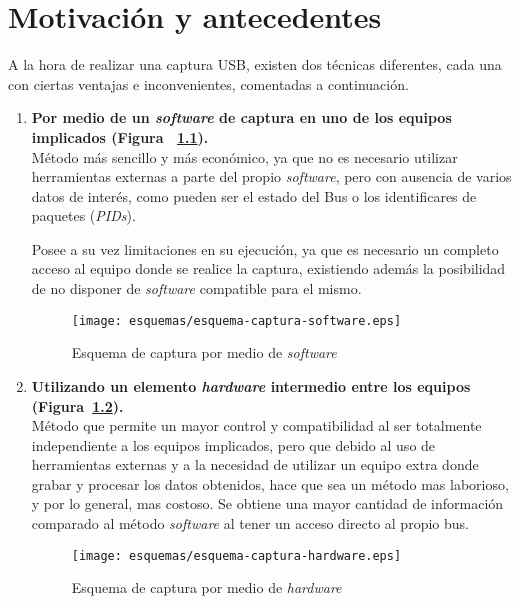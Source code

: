 \chapter{Motivación y antecedentes}
\label{ch:antecedentes}

A la hora de realizar una captura USB, existen dos técnicas diferentes, cada una con ciertas ventajas e inconvenientes, comentadas a continuación.
\begin{enumerate}
    \item \textbf{Por medio de un \textit{software} de captura en uno de los equipos implicados (Figura ~\ref{fig:captura-SW}).} \\
    Método más sencillo y más económico, ya que no es necesario utilizar herramientas externas a parte del propio \textit{software}, pero con ausencia de varios datos de interés, como pueden ser el estado del Bus o los identificares de paquetes (\emph{PIDs}).
    
    Posee a su vez limitaciones en su ejecución, ya que es necesario un completo acceso al equipo donde se realice la captura, existiendo además la posibilidad de no disponer de \textit{software} compatible para el mismo. 
    \begin{figure}[hbt]
        \centering
        \texttt{[image: esquemas/esquema-captura-software.eps]}
        \caption{Esquema de captura por medio de \textit{software}}
        \label{fig:captura-SW}
    \end{figure}
    
    \item \textbf{Utilizando un elemento \textit{hardware} intermedio entre los equipos (Figura~\ref{fig:captura-HW}).} \\
    Método que permite un mayor control y compatibilidad al ser totalmente independiente a los equipos implicados, pero que debido al uso de herramientas externas y a la necesidad de utilizar un equipo extra donde grabar y procesar los datos obtenidos, hace que sea un método mas laborioso, y por lo general, mas costoso.
    Se obtiene una mayor cantidad de información comparado al método \textit{software} al tener un acceso directo al propio bus.
    \begin{figure}[hbt]
        \centering
        \texttt{[image: esquemas/esquema-captura-hardware.eps]}
        \caption{Esquema de captura por medio de \textit{hardware}}
        \label{fig:captura-HW}
    \end{figure}
\end{enumerate}



